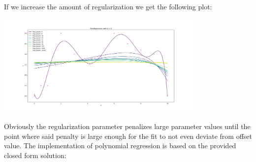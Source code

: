 \documentclass{article}
\newcommand{\1}{\mathbf{1}}
\begin{document}
If we increase the amount of regularization we get the following plot:
\begin{center}
    \includegraphics[width=4in]{HW1/HW1_plots/PolyFitRegularization.png}
\end{center} 
Obviously the regularization parameter penalizes large parameter values until the point where said penalty is large enough for the fit to not even deviate from offset value. The implementation of polynomial regression is based on the provided closed form solution:
\end{document}
